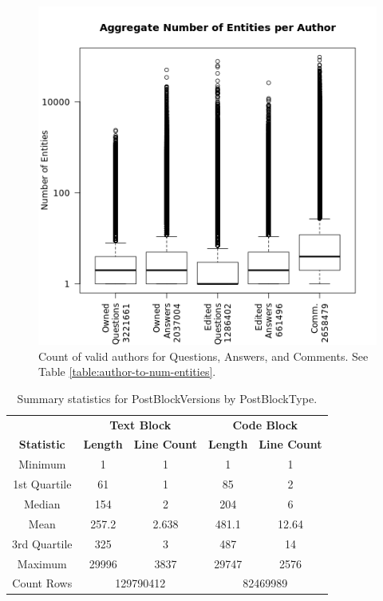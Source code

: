 \documentclass[a4paper,11pt, notitlepage]{report}
\theoremstyle{definition}
\numberwithin{equation}{section}		%
\begin{document}
\begin{figure}[ht]
    \centering
    \includegraphics[width=6in]{figures/num_entities_per_author.png}
    \caption{Count of valid authors for Questions, Answers, and Comments. See Table \ref{table:author-to-num-entities}.}
    \label{fig:author-to-num-entiies}
\end{figure}

\begin{table}[]
    \centering
    \begin{tabular}{c|cc|cc}
    \hline
    & \multicolumn{2}{c}{\textbf{Text Block}} & \multicolumn{2}{c}{\textbf{Code Block}} \\
    \textbf{Statistic} & \textbf{Length} & \textbf{Line Count} & \textbf{Length} & \textbf{Line Count} \\ \hline
    Minimum         & 1     & 1     & 1     & 1     \\
    1st Quartile    & 61    & 1     & 85    & 2     \\
    Median          & 154   & 2     & 204   & 6     \\
    Mean            & 257.2 & 2.638 & 481.1 & 12.64 \\
    3rd Quartile    & 325   & 3     & 487   & 14    \\
    Maximum         & 29996 & 3837  & 29747 & 2576  \\ \hline
    Count Rows      & \multicolumn{2}{c}{129790412} & \multicolumn{2}{c}{82469989} \\
    \end{tabular}
    \caption{Summary statistics for PostBlockVersions by PostBlockType.}
    \label{tab:post-block-version-stats}
\end{table}
\end{document}

